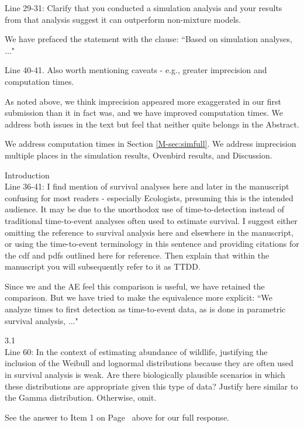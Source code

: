\documentclass[12pt]{article}
\renewenvironment{quote}  %
              {\list{}{\rightmargin\leftmargin}\normalfont%
               \item\relax}
              {\endlist}
\begin{document}
Line 29-31: Clarify that you conducted a simulation analysis and your results from that analysis suggest it can outperform non-mixture models.
\begin{quote}
We have prefaced the statement with the clause: ``Based on simulation analyses, ..."
\end{quote}

Line 40-41.  Also worth mentioning caveats - e.g., greater imprecision and computation times.
\begin{quote}

As noted above, we think imprecision appeared more exaggerated in our first submission than it in fact was, and we have improved computation times.
We address both issues in the text but feel that neither quite belongs in the Abstract.

We address computation times in Section \ref{M-sec:simfull}.
We address imprecision multiple places in the simulation results, Ovenbird results, and Discussion.
\end{quote}

Introduction\\
Line 36-41: I find mention of survival analyses here and later in the manuscript confusing for most readers - especially Ecologists, presuming this is the intended audience.  It may be due to the unorthodox use of time-to-detection instead of traditional time-to-event analyses often used to estimate survival.  I suggest either omitting the reference to survival analysis here and elsewhere in the manuscript, or using the time-to-event terminology in this sentence and providing citations for the cdf and pdfs outlined here for reference.  Then explain that within the manuscript you will subsequently refer to it as TTDD.  
\begin{quote}
Since we and the AE feel this comparison is useful, 
we have retained the comparison. 
But we have tried to make the equivalence more explicit: ``We analyze times to first 
detection as time-to-event data, as is done in parametric survival analysis, ..."
\end{quote}

3.1 \\
Line 60: In the context of estimating abundance of wildlife, justifying the inclusion of the Weibull and lognormal distributions because they are often used in survival analysis is weak.  Are there biologically plausible scenarios in which these distributions are appropriate given this type of data?  Justify here similar to the Gamma distribution.  Otherwise, omit.
\begin{quote}
See the answer to Item 1 on Page~\pageref{ans:one} above for our full response.
\end{quote}
\end{document}
